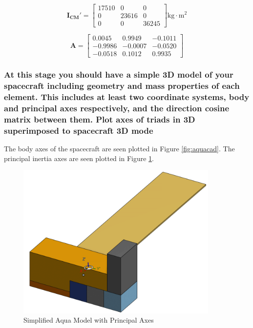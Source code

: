 \begin{equation*}
    \boldsymbol{I_{CM}'} = \begin{bmatrix}
        17510 & 0 & 0 \\
        0 & 23616 & 0 \\
        0 & 0 & 36245
    \end{bmatrix} \text{kg} \cdot \text{m}^2
\end{equation*}

\begin{equation*}
    \boldsymbol{A} = \begin{bmatrix}
            0.0045  &  0.9949 &  -0.1011 \\
            -0.9986  & -0.0007  & -0.0520 \\
            -0.0518  &  0.1012  &  0.9935
    \end{bmatrix}
\end{equation*}

\subsubsection{At this stage you should have a simple 3D model of your spacecraft including geometry and mass properties of each element. This includes at least two coordinate systems, body and principal axes respectively, and the direction cosine matrix between them. Plot axes of triads in 3D superimposed to spacecraft 3D mode}

The body axes of the spacecraft are seen plotted in Figure \ref{fig:aquacad}. The principal inertia axes are seen plotted in Figure \ref{fig:aquacad_principal}.

\begin{figure}[H]
    \centering
    \includegraphics[width = 10cm]{Images/AquaSat_PrincipalAxes.png}
    \caption{Simplified Aqua Model with Principal Axes}
    \label{fig:aquacad_principal}
\end{figure}


